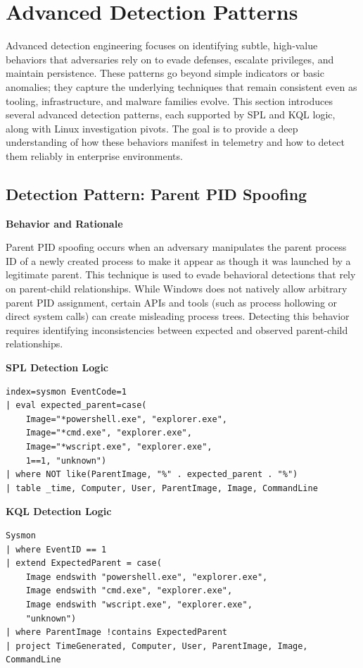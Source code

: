 \section{Advanced Detection Patterns}

Advanced detection engineering focuses on identifying subtle, high‑value behaviors that adversaries rely on to evade defenses, escalate privileges, and maintain persistence. These patterns go beyond simple indicators or basic anomalies; they capture the underlying techniques that remain consistent even as tooling, infrastructure, and malware families evolve. This section introduces several advanced detection patterns, each supported by SPL and KQL logic, along with Linux investigation pivots. The goal is to provide a deep understanding of how these behaviors manifest in telemetry and how to detect them reliably in enterprise environments.

\subsection*{Detection Pattern: Parent PID Spoofing}

\textbf{Behavior and Rationale}

Parent PID spoofing occurs when an adversary manipulates the parent process ID of a newly created process to make it appear as though it was launched by a legitimate parent. This technique is used to evade behavioral detections that rely on parent-child relationships. While Windows does not natively allow arbitrary parent PID assignment, certain APIs and tools (such as process hollowing or direct system calls) can create misleading process trees. Detecting this behavior requires identifying inconsistencies between expected and observed parent-child relationships.

\textbf{SPL Detection Logic}
\begin{lstlisting}
index=sysmon EventCode=1
| eval expected_parent=case(
    Image="*powershell.exe", "explorer.exe",
    Image="*cmd.exe", "explorer.exe",
    Image="*wscript.exe", "explorer.exe",
    1==1, "unknown")
| where NOT like(ParentImage, "%" . expected_parent . "%")
| table _time, Computer, User, ParentImage, Image, CommandLine
\end{lstlisting}

\textbf{KQL Detection Logic}
\begin{lstlisting}
Sysmon
| where EventID == 1
| extend ExpectedParent = case(
    Image endswith "powershell.exe", "explorer.exe",
    Image endswith "cmd.exe", "explorer.exe",
    Image endswith "wscript.exe", "explorer.exe",
    "unknown")
| where ParentImage !contains ExpectedParent
| project TimeGenerated, Computer, User, ParentImage, Image, CommandLine
\end{lstlisting}

